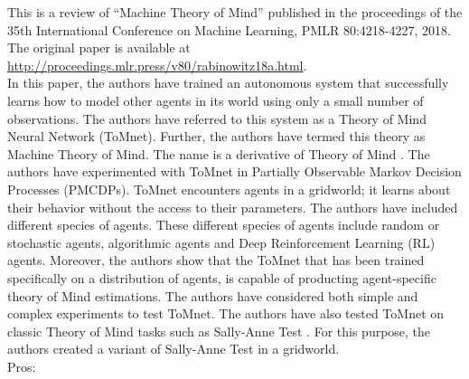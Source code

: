 \documentclass{article}
\title{\titletext}
\author{Robin Khatri}
\begin{document}
\maketitle

\noindent %
This is a review of \enquote{Machine Theory of Mind}  published in the proceedings of the 35th International Conference on Machine Learning, PMLR 80:4218-4227, 2018. The original paper is available at \href{http://proceedings.mlr.press/v80/rabinowitz18a.html}{http://proceedings.ml\linebreak r.press/v80/rabinowitz18a.html}.
\\

\noindent
In this paper, the authors have trained an autonomous system that successfully learns how to model other agents in its world using only a small number of observations. The authors have referred to this system as a Theory of Mind Neural Network (ToMnet). Further, the authors have termed this theory as Machine Theory of Mind. The name is a derivative of Theory of Mind \cite{Premack1978}. The authors have experimented with ToMnet in Partially Observable Markov Decision Processes (PMCDPs). ToMnet encounters agents in a gridworld; it learns about their behavior without the access to their parameters. The authors have included different species of agents. These different species of agents include random or stochastic agents, algorithmic agents and Deep Reinforcement Learning (RL) agents. Moreover, the authors show that the ToMnet that has been trained specifically on a distribution of agents, is capable of producting agent-specific theory of Mind estimations. The authors have considered both simple and complex experiments to test ToMnet. The authors have also tested ToMnet on classic Theory of Mind tasks such as Sally-Anne Test \cite{BaronCohen1985}. For this purpose, the authors created a variant of Sally-Anne Test in a gridworld.
\\

\noindent
{Pros:}

\def\Plus{\texttt{+}} %
\end{document}
